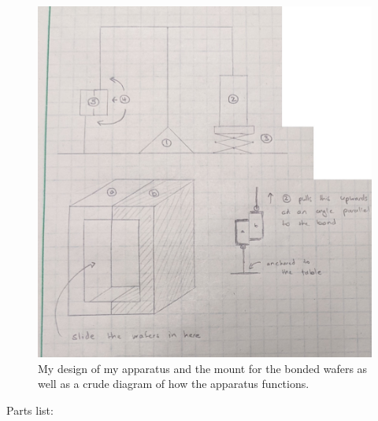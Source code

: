 \documentclass[colorlinks=true,pdfstartview=FitV,linkcolor=blue,
            citecolor=red,urlcolor=magenta]{ligodoc}
\begin{document}
\begin{appendices}
\newpage

\begin{figure}[htbp]
\begin{center}
\includegraphics[width=6in]{graphics/scratchwork.jpg}
\caption{My design of my apparatus and the mount for the bonded wafers as well as a crude diagram of how the apparatus functions.}
\label{fig:myapparatus}
\end{center}
\end{figure}

\newpage

Parts list:


\end{appendices}
\end{document}
